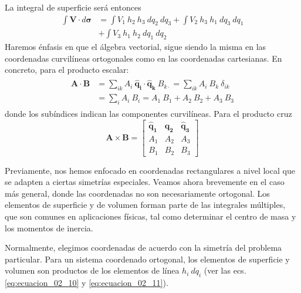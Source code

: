 La integral de superficie será entonces
\begin{align*}
\int \mathbf{V} \cdot d \bm{\sigma} &= \int V_{1} \: h_{2} \: h_{3} \: d q_{2} \: d q_{3} + \int V_{2} \: h_{3} \: h_{1} \: d q_{3} \: d q_{1} \\
&+ \int V_{3} \: h_{1} \: h_{2} \: d q_{1} \: d q_{2}
\end{align*}
Haremos énfasis en que el álgebra vectorial, sigue siendo la misma en las coordenadas curvilíneas ortogonales como en las coordenadas cartesianas. En concreto, para el producto escalar:
\begin{align}
\begin{aligned}
\mathbf{A} \cdot \mathbf{B} &= \sum_{ik} A_{i} \: \mathbf{\widehat{q}_{i}} \cdot \mathbf{\widehat{q}_{k}} \: B_{k\cdot} = \sum_{ik} A_{i} \: B_{k} \: \delta_{ik} \\
&= \sum_{i} A_{i} \: B_{i} = A_{1} \: B_{1} + A_{2} \: B_{2} + A_{3} \: B_{3}
\end{aligned}
\label{eq:ecuacion_02_12}
\end{align}
donde los subíndices indican las componentes curvilíneas. Para el producto cruz
\begin{equation}
\mathbf{A} \times \mathbf{B} = \begin{bmatrix}
\mathbf{\widehat{q}_{1}} & \mathbf{\widehat{q}_{2}} & \mathbf{\widehat{q}_{3}} \\
A_{1} & A_{2} & A_{3} \\
B_{1} & B_{2} & B_{3}
\end{bmatrix}
\label{eq:ecuacion_02_13}
\end{equation}

Previamente, nos hemos enfocado en coordenadas rectangulares a nivel local que se adapten a ciertas simetrías especiales. Veamos ahora brevemente en el caso más general, donde las coordenadas no son necesariamente ortogonal. Los elementos de superficie y de volumen forman parte de las integrales múltiples, que son comunes en aplicaciones físicas, tal como determinar el centro de masa y los momentos de inercia.

Normalmente, elegimos coordenadas de acuerdo con la simetría del problema particular. Para un sistema coordenado ortogonal, los elementos de superficie y volumen son productos de los elementos de línea $h_{i} \: dq_{i}$ (ver las ecs. \ref{eq:ecuacion_02_10} y \ref{eq:ecuacion_02_11}).


